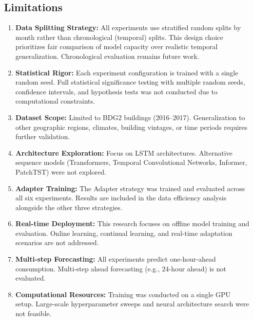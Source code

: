 \documentclass[12pt,a4paper]{report}
\begin{document}
\subsection{Limitations}

\begin{enumerate}
    \item \textbf{Data Splitting Strategy:} All experiments use stratified random splits by month rather than chronological (temporal) splits. This design choice prioritizes fair comparison of model capacity over realistic temporal generalization. Chronological evaluation remains future work.
    
    \item \textbf{Statistical Rigor:} Each experiment configuration is trained with a single random seed. Full statistical significance testing with multiple random seeds, confidence intervals, and hypothesis tests was not conducted due to computational constraints.
    
    \item \textbf{Dataset Scope:} Limited to BDG2 buildings (2016--2017). Generalization to other geographic regions, climates, building vintages, or time periods requires further validation.
    
    \item \textbf{Architecture Exploration:} Focus on LSTM architectures. Alternative sequence models (Transformers, Temporal Convolutional Networks, Informer, PatchTST) were not explored.
    
    \item \textbf{Adapter Training:} The Adapter strategy was trained and evaluated across all six experiments. Results are included in the data efficiency analysis alongside the other three strategies.
    
    \item \textbf{Real-time Deployment:} This research focuses on offline model training and evaluation. Online learning, continual learning, and real-time adaptation scenarios are not addressed.
    
    \item \textbf{Multi-step Forecasting:} All experiments predict one-hour-ahead consumption. Multi-step ahead forecasting (e.g., 24-hour ahead) is not evaluated.
    
    \item \textbf{Computational Resources:} Training was conducted on a single GPU setup. Large-scale hyperparameter sweeps and neural architecture search were not feasible.
\end{enumerate}
\end{document}
